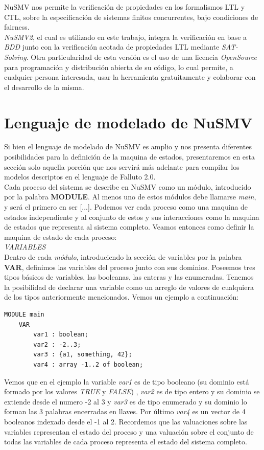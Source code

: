 \documentclass[titlepage, 12pt]{book}
\begin{document}
NuSMV nos permite la verificaci\'on de propiedades en los formalismos LTL y CTL, sobre la especificaci\'on de sistemas finitos concurrentes, bajo condiciones de fairness.\\

\textit{NuSMV2}, el cual es utilizado en este trabajo, integra la verificaci\'on en base a \textit{BDD} junto con la verificaci\'on acotada de propiedades LTL mediante \textit{SAT-Solving}. Otra particularidad de esta versi\'on es el uso de una licencia \textit{OpenSource} para programaci\'on y distribuci\'on abierta de su c\'odigo, lo cual permite, a cualquier persona interesada, usar la herramienta gratuitamente y colaborar con el desarrollo de la misma.


\section{Lenguaje de modelado de NuSMV}
Si bien el lenguaje de modelado de NuSMV es amplio y nos presenta diferentes posibilidades para la definici\'on de la maquina de estados, presentaremos en esta secci\'on solo aquella porci\'on que nos servir\'a m\'as adelante para compilar los modelos descriptos en el lenguaje de Falluto 2.0.\\

Cada proceso del sistema se describe en NuSMV como un m\'odulo, introducido por la palabra \textbf{MODULE}. Al menos uno de estos m\'odulos debe llamarse \textit{main}, y ser\'a el primero en ser [...]. Podemos ver cada proceso como una maquina de estados independiente y al conjunto de estos y sus interacciones como la maquina de estados que representa al sistema completo. Veamos entonces como definir la maquina de estado de cada proceso:\\

\textit{VARIABLES}\\

Dentro de cada \textit{m\'odulo}, introduciendo la secci\'on de variables por la palabra \textbf{VAR}, definimos las variables del proceso junto con sus dominios. Poseemos tres tipos b\'asicos de variables, las booleanas, las enteras y las enumeradas. Tenemos la posibilidad de declarar una variable como un arreglo de valores de cualquiera de los tipos anteriormente mencionados. Vemos un ejemplo a continuaci\'on:
\begin{verbatim}
MODULE main
    VAR
        var1 : boolean;
        var2 : -2..3;
        var3 : {a1, something, 42};
        var4 : array -1..2 of boolean;
\end{verbatim}
Vemos que en el ejemplo la variable \textit{var1} es de tipo booleano (su dominio est\'a formado por los valores \textit{TRUE} y \textit{FALSE}) , \textit{var2} es de tipo entero y su dominio se extiende desde el numero -2 al 3 y \textit{var3} es de tipo enumerado y su dominio lo forman las 3 palabras encerradas en llaves. Por \'ultimo \textit{var4} es un vector de 4 booleanos indexado desde el -1 al 2. Recordemos que las valuaciones sobre las variables representan el estado del proceso y una valuaci\'on sobre el conjunto de todas las variables de cada proceso representa el estado del sistema completo.\\
\end{document}
